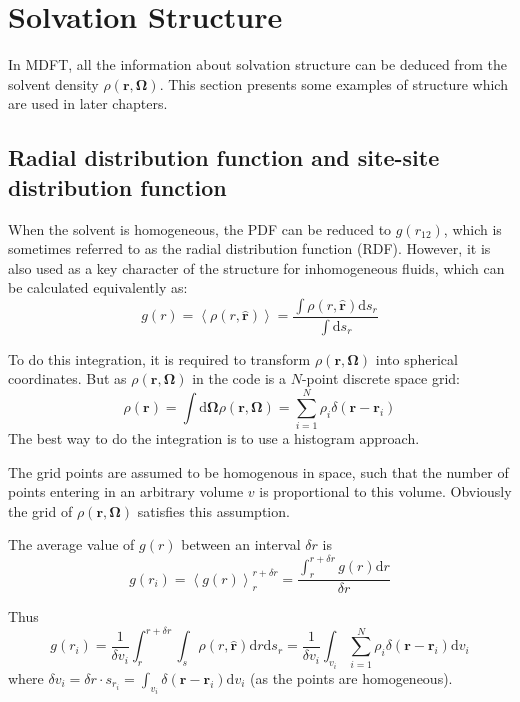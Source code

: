 
\chapter{Solvation Structure\label{chpt:solvation-structure}}

In MDFT, all the information about solvation structure can be deduced
from the solvent density $\rho(\mathbf{r},\mathbf{\Omega})$. This
section presents some examples of structure which are used in later
chapters.

\section{Radial distribution function and site-site distribution function}

When the solvent is homogeneous, the \acs{PDF} can be reduced to
$g(r_{12})$, which is sometimes referred to as the radial distribution
function (\acs{RDF}). However, it is also used as a key character
of the structure for inhomogeneous fluids, which can be calculated
equivalently as:
\begin{equation}
g(r)=\left\langle \rho(r,\hat{\mathbf{r}})\right\rangle =\dfrac{\int\rho(r,\hat{\mathbf{r}})\mathrm{d}s_{r}}{\int\mathrm{d}s_{r}}
\end{equation}

To do this integration, it is required to transform $\rho(\mathbf{r},\mathbf{\Omega})$
into spherical coordinates. But as $\rho(\mathbf{r},\mathbf{\Omega})$
in the code is a $N$-point discrete space grid:
\begin{equation}
\rho(\mathbf{r})=\int\mathrm{d}\mathbf{\Omega}\rho(\mathbf{r},\mathbf{\Omega})=\sum_{i=1}^{N}\rho_{i}\delta(\mathbf{r}-\mathbf{r}_{i})
\end{equation}
The best way to do the integration is to use a histogram approach.

The grid points are assumed to be homogenous in space, such that the
number of points entering in an arbitrary volume $v$ is proportional
to this volume. Obviously the grid of $\rho(\mathbf{r},\mathbf{\Omega})$
satisfies this assumption.

The average value of $g(r)$ between an interval $\delta r$ is
\begin{equation}
g(r_{i})=\left\langle g(r)\right\rangle _{r}^{r+\delta r}=\dfrac{\int_{r}^{r+\delta r}g(r)\mathrm{d}r}{\delta r}
\end{equation}

Thus
\begin{equation}
g(r_{i})=\dfrac{1}{\delta v_{i}}\int_{r}^{r+\delta r}\int_{s}\rho(r,\hat{\mathbf{r}})\mathrm{d}r\mathrm{d}s_{r}=\dfrac{1}{\delta v_{i}}\int_{v_{i}}\sum_{i=1}^{N}\rho_{i}\delta(\mathbf{r}-\mathbf{r}_{i})\mathrm{d}v_{i}
\end{equation}
where $\delta v_{i}=\delta r\cdot s_{r_{i}}=\int_{v_{i}}\delta(\mathbf{r}-\mathbf{r}_{i})\mathrm{d}v_{i}$
(as the points are homogeneous). 

